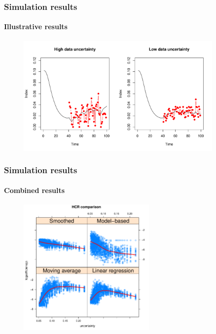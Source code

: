 \documentclass[pdf]{beamer}
\begin{document}
\begin{frame}
\frametitle{Simulation results}
\framesubtitle{Illustrative results}

\begin{figure}
\includegraphics[width=0.9\textwidth]{../res/uncertainty_index.pdf}
\end{figure}

\end{frame}


\begin{frame}
\frametitle{Simulation results}
\framesubtitle{Combined results}

\begin{figure}
\includegraphics[width=0.6\textwidth]{../res/hcr_all_plot.pdf}
\end{figure}


\end{frame}
\end{document}

